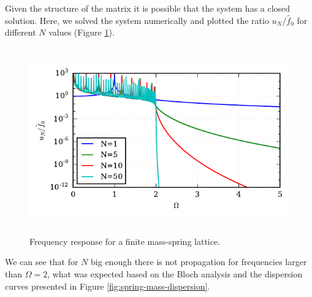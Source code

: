 \documentclass[11pt]{article}
\begin{document}
Given the structure of the matrix it is possible that the system has a closed solution. Here, we solved the system numerically and plotted the ratio $u_N/\hat{f}_0$ for different $N$ values (Figure \ref{fig:single-finite}).
\begin{figure}[h]
\centering
\includegraphics[height=8cm]{img/single_finite.pdf} 
\caption{Frequency response for a finite mass-spring lattice.}\label{fig:single-finite}
\end{figure}

We can see that for $N$ big enough there is not propagation for frequencies larger than $\Omega=2$, what was expected based on the Bloch analysis and the dispersion curves presented in Figure \ref{fig:spring-mass-dispersion}.


\end{document}
